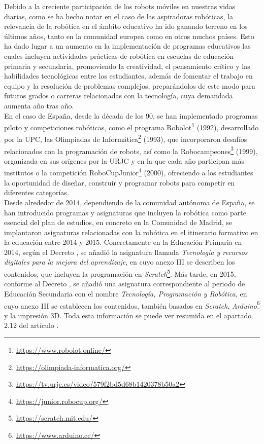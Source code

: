 Debido a la creciente participación de los robots móviles en nuestras vidas
diarias, como se ha hecho notar en el caso de las aspiradoras robóticas, la
relevancia de la robótica en el ámbito educativo ha ido ganando terreno en los
últimos años, tanto en la comunidad europea como en otros muchos países.
Esto ha dado lugar a un aumento en la implementación de programas educativos las
cuales incluyen actividades prácticas de robótica en escuelas de educación
primaria y secundaria, promoviendo la creatividad, el pensamiento crítico y las
habilidades tecnológicas entre los estudiantes, además de fomentar el trabajo en
equipo y la resolución de problemas complejos, preparándolos de este modo para
futuros grados o carreras relacionadas con la tecnología, cuya demandada aumenta
año tras año.
\\

En el caso de España, desde la década de los 90, se han implementado programas
piloto y competiciones robóticas, como el programa Robolot\footnote{
\href{https://www.robolot.online/}{https://www.robolot.online/}} (1992),
desarrollado por la UPC, las Olimpiadas de Informática\footnote{
\href{https://olimpiada-informatica.org/}{https://olimpiada-informatica.org/}}
(1993), que incorporaron desafíos relacionados con la programación de robots,
así como la Robocampeones\footnote{
\href{https://tv.urjc.es/video/579f2bd5d68b1420378b50a2}{https://tv.urjc.es/video/579f2bd5d68b1420378b50a2}}
(1999), organizada en sus orígenes por la URJC y en la que cada año participan
más institutos o la competición RoboCupJunior\footnote{
\href{https://junior.robocup.org/}{https://junior.robocup.org/}} (2000),
ofreciendo a los estudiantes la oportunidad de diseñar, construir y programar
robots para competir en diferentes categorías.
\\

Desde alrededor de 2014, dependiendo de la comunidad autónoma de España, se han
introducido programas y asignaturas que incluyen la robótica como parte esencial
del plan de estudios, en concreto en la Comunidad de Madrid, se implantaron
asignaturas relacionadas con la robótica en el itinerario formativo en la
educación entre 2014 y 2015.
Concretamente en la Educación Primaria en 2014, según el Decreto
\cite{Decreto2014}, se añadió la asignatura llamada \textit{Tecnología y
recursos digitales para la mejora del aprendizaje}, en cuyo anexo III se
describen los contenidos, que incluyen la programación en
\textit{Scratch}\footnote{
\href{https://scratch.mit.edu/}{https://scratch.mit.edu/}}.
Más tarde, en 2015, conforme al Decreto \cite{Decreto2015}, se añadió una
asignatura correspondiente al periodo de Educación Secundaria con el nombre
\textit{Tecnología, Programación y Robótica}, en cuyo anexo III se establecen
los contenidos, también basados en \textit{Scratch}, \textit{Arduino}\footnote{
\href{https://www.arduino.cc/}{https://www.arduino.cc/}} y la impresión 3D.
Toda esta información se puede ver resumida en el apartado 2.12 del artículo
\cite{EducacionRob}.
\\

